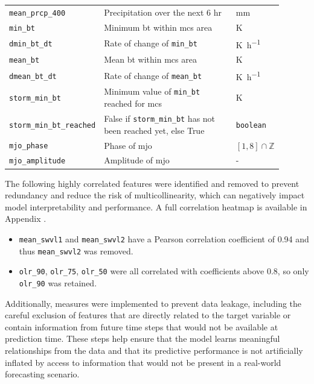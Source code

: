 {\begin{longtable}{>{\raggedright\arraybackslash}p{0.25\linewidth} p{0.50\linewidth} >{\raggedright\arraybackslash}p{0.15\linewidth}}
    \texttt{mean\_prcp\_400} & Precipitation over the next 6 hr & \unit{\milli\meter} \\
    \texttt{min\_bt} & Minimum \acrfull{bt} within \acrshort{mcs} area & \unit{\kelvin} \\
    \texttt{dmin\_bt\_dt} & Rate of change of \texttt{min\_bt} & \unit{\kelvin\per\hour} \\
    \texttt{mean\_bt} & Mean \acrshort{bt} within \acrshort{mcs} area & \unit{\kelvin} \\
    \texttt{dmean\_bt\_dt} & Rate of change of \texttt{mean\_bt} & \unit{\kelvin\per\hour} \\
    \texttt{storm\_min\_bt} & Minimum value of \texttt{min\_bt} reached for \acrshort{mcs} & \unit{\kelvin} \\
    \texttt{storm\_min\_bt\_reached} & False if \texttt{storm\_min\_bt} has not been reached yet, else True & \texttt{boolean} \\
    \texttt{mjo\_phase} & Phase of \acrfull{mjo} & $[1, 8] \cap \mathbb{Z}$ \\
    \texttt{mjo\_amplitude} & Amplitude of \acrshort{mjo} & - \\
\end{longtable}
}

The following highly correlated features were identified and removed to prevent redundancy and reduce the risk of multicollinearity, which can negatively impact model interpretability and performance. A full correlation heatmap is available in Appendix .
\begin{itemize}
    \item \texttt{mean\_swvl1} and \texttt{mean\_swvl2} have a Pearson correlation coefficient of 0.94 and thus \texttt{mean\_swvl2} was removed.
    \item \texttt{olr\_90}, \texttt{olr\_75}, \texttt{olr\_50} were all correlated with coefficients above 0.8, so only \texttt{olr\_90} was retained.
\end{itemize}
Additionally, measures were implemented to prevent data leakage, including the careful exclusion of features that are directly related to the target variable or contain information from future time steps that would not be available at prediction time. These steps help ensure that the model learns meaningful relationships from the data and that its predictive performance is not artificially inflated by access to information that would not be present in a real-world forecasting scenario.

